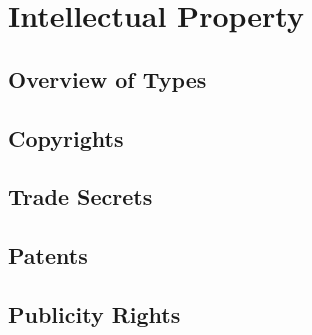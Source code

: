 \chapter{Intellectual Property}



\section{Overview of Types}




\section{Copyrights}

%
%





\begin{questions}

\end{questions}


\section{Trade Secrets}



\begin{questions}

\end{questions}


\section{Patents}





\begin{questions}

\end{questions}


\section{Publicity Rights}



%
%


\begin{questions}

\end{questions}



